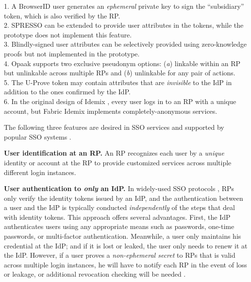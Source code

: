 \begin{table}[tb]
\begin{tabular}{|c|c|c|c|c|c|c|}
\end{tabular}
    \label{tbl:comparison-protocol}
\flushleft
{\footnotesize
1. A BrowserID user generates an \emph{ephemeral} private key to sign the ``subsidiary'' token,
 which is also verified by the RP.\\
2. SPRESSO can be extended to provide user attributes in the tokens, while the prototype does not implement this feature.\\
3. Blindly-signed user attributes can be selectively provided using zero-knowledge proofs but not implemented in the prototype.\\
4. Opaak supports two exclusive pseudonym options: (\emph{a}) linkable within an RP but unlinkable across multiple RPs and (\emph{b}) unlinkable for any pair of actions.\\
5. The U-Prove token may contain attributes that are \emph{invisible} to the IdP in addition to the ones confirmed by the IdP. \\
6. In the original design of Idemix \cite{idemix}, every user logs in to an RP with a unique account, but Fabric Idemix implements completely-anonymous services.
}
\end{table}

The following three features are desired in SSO services and supported by popular SSO systems \cite{NIST2017draft, OpenIDConnect,rfc6749, SAML, SAMLIdentifier}.

\noindent \textbf{User identification at an RP.}
An RP recognizes each user by a \emph{unique} identity or account at the RP to provide customized services across multiple different login instances.

\noindent\textbf{User authentication to {\em only} an IdP.}
In widely-used SSO protocols \cite{OpenIDConnect, rfc6749, SAML}, RPs only verify the identity tokens issued by an IdP, and the authentication between a user and the IdP is typically conducted \emph{independently} of the steps that deal with identity tokens. This approach offers several advantages. First, the IdP authenticates users using any appropriate means such as passwords, one-time passwords, or multi-factor authentication.
Meanwhile, a user only maintains his credential at the IdP; and if it is lost or leaked, the user only needs to renew it at the IdP.
However, if a user proves a \emph{non-ephemeral secret} to RPs that is valid across multiple login instances, he will have to notify each RP in the event of loss or leakage, or additional revocation checking will be needed \cite{ELPASSO, UnlimitID}.

